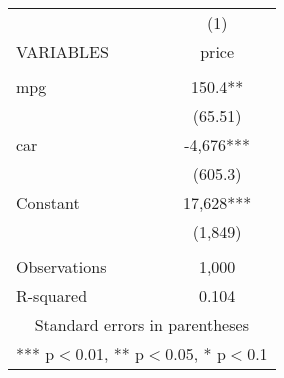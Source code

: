 \documentclass[]{article}
\begin{document}
\begin{tabular}{lc} \hline
 & (1) \\
VARIABLES & price \\ \hline
 &  \\
mpg & 150.4** \\
 & (65.51) \\
car & -4,676*** \\
 & (605.3) \\
Constant & 17,628*** \\
 & (1,849) \\
 &  \\
Observations & 1,000 \\
 R-squared & 0.104 \\ \hline
\multicolumn{2}{c}{ Standard errors in parentheses} \\
\multicolumn{2}{c}{ *** p$<$0.01, ** p$<$0.05, * p$<$0.1} \\
\end{tabular}
\end{document}
